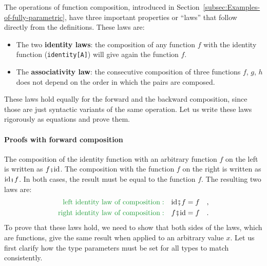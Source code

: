The operations of function composition, introduced in Section~\ref{subsec:Examples-of-fully-parametric},
have three important properties or \textsf{``}laws\textsf{''} that follow directly
from the definitions. These laws are:
\begin{itemize}
\item The two \textbf{identity laws}:
the composition of any function $f$ with the identity function (\lstinline!identity[A]!)
will give again the function $f$.
\item The \textbf{associativity law}:
the consecutive composition of three functions $f$, $g$, $h$ does
not depend on the order in which the pairs are composed.
\end{itemize}
These laws hold equally for the forward and the backward composition,
since those are just syntactic variants of the same operation. Let
us write these laws rigorously as equations and prove them.

\paragraph{Proofs with forward composition}

The composition of the identity function with an arbitrary function
$f$ on the left is written as $f\bef\text{id}$. The composition
with the function $f$ on the right is written as $\text{id}\bef f$.
In both cases, the result must be equal to the function $f$. The
resulting two laws are:
\begin{align*}
{\color{greenunder}\text{left identity law of composition}:}\quad & \text{id}\bef f=f\quad,\\
{\color{greenunder}\text{right identity law of composition}:}\quad & f\bef\text{id}=f\quad.
\end{align*}
To prove that these laws hold, we need to show that both sides of
the laws, which are functions, give the same result when applied to
an arbitrary value $x$. Let us first clarify how the type parameters
must be set for all types to match consistently.

